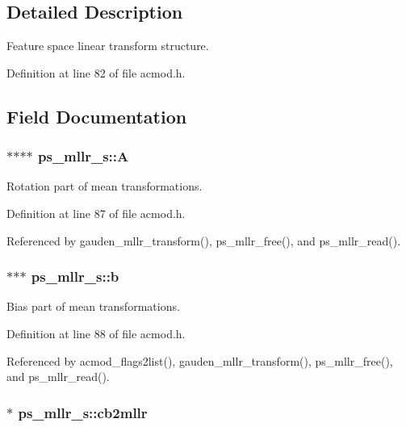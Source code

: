 \subsection{\-Detailed \-Description}
\-Feature space linear transform structure. 

\-Definition at line 82 of file acmod.\-h.



\subsection{\-Field \-Documentation}
\subsubsection[{\-A}]{$\ast$$\ast$$\ast$$\ast$ {\bf ps\-\_\-mllr\-\_\-s\-::\-A}}\label{structps__mllr__s_a4cfa5d4c6637282b947b525a673cc3d0}


\-Rotation part of mean transformations. 



\-Definition at line 87 of file acmod.\-h.



\-Referenced by gauden\-\_\-mllr\-\_\-transform(), ps\-\_\-mllr\-\_\-free(), and ps\-\_\-mllr\-\_\-read().

\subsubsection[{b}]{$\ast$$\ast$$\ast$ {\bf ps\-\_\-mllr\-\_\-s\-::b}}\label{structps__mllr__s_a65430ba654d0af5e508715de24077f2d}


\-Bias part of mean transformations. 



\-Definition at line 88 of file acmod.\-h.



\-Referenced by acmod\-\_\-flags2list(), gauden\-\_\-mllr\-\_\-transform(), ps\-\_\-mllr\-\_\-free(), and ps\-\_\-mllr\-\_\-read().

\subsubsection[{cb2mllr}]{$\ast$ {\bf ps\-\_\-mllr\-\_\-s\-::cb2mllr}}\label{structps__mllr__s_a745c4b69be55cef8629abab02f474bb9}


